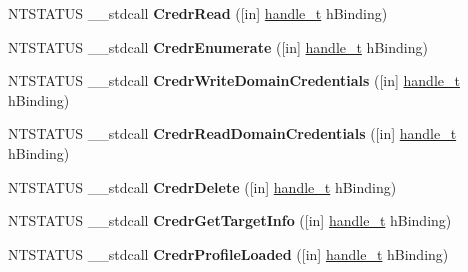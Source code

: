 \begin{DoxyCompactItemize}
\item 
\mbox{\label{interfacelsarpc_a4d760ee631ec37eff292f68b0b21cf38}} 
N\+T\+S\+T\+A\+T\+US \+\_\+\+\_\+stdcall {\bfseries Credr\+Read} (\mbox{[}in\mbox{]} \hyperlink{interfacevoid}{handle\+\_\+t} h\+Binding)
\item 
\mbox{\label{interfacelsarpc_aa58b15bcaeffe97d6f6e6b4180492862}} 
N\+T\+S\+T\+A\+T\+US \+\_\+\+\_\+stdcall {\bfseries Credr\+Enumerate} (\mbox{[}in\mbox{]} \hyperlink{interfacevoid}{handle\+\_\+t} h\+Binding)
\item 
\mbox{\label{interfacelsarpc_a44e2bdf624f11f2beab93027a9e950b8}} 
N\+T\+S\+T\+A\+T\+US \+\_\+\+\_\+stdcall {\bfseries Credr\+Write\+Domain\+Credentials} (\mbox{[}in\mbox{]} \hyperlink{interfacevoid}{handle\+\_\+t} h\+Binding)
\item 
\mbox{\label{interfacelsarpc_a36f7d4e0851fe08984b3a36328f3301f}} 
N\+T\+S\+T\+A\+T\+US \+\_\+\+\_\+stdcall {\bfseries Credr\+Read\+Domain\+Credentials} (\mbox{[}in\mbox{]} \hyperlink{interfacevoid}{handle\+\_\+t} h\+Binding)
\item 
\mbox{\label{interfacelsarpc_a7579e78ca5b31120a68e4d9c5e56bab1}} 
N\+T\+S\+T\+A\+T\+US \+\_\+\+\_\+stdcall {\bfseries Credr\+Delete} (\mbox{[}in\mbox{]} \hyperlink{interfacevoid}{handle\+\_\+t} h\+Binding)
\item 
\mbox{\label{interfacelsarpc_a99f29c387b38ebd047d2347c46216837}} 
N\+T\+S\+T\+A\+T\+US \+\_\+\+\_\+stdcall {\bfseries Credr\+Get\+Target\+Info} (\mbox{[}in\mbox{]} \hyperlink{interfacevoid}{handle\+\_\+t} h\+Binding)
\item 
\mbox{\label{interfacelsarpc_adfc28846e3a30aae12e7824d61e321ad}} 
N\+T\+S\+T\+A\+T\+US \+\_\+\+\_\+stdcall {\bfseries Credr\+Profile\+Loaded} (\mbox{[}in\mbox{]} \hyperlink{interfacevoid}{handle\+\_\+t} h\+Binding)
\item 
\mbox{\label{interfacelsarpc_a2be9e6be356468b06ea04ea24403e532}} 

\end{DoxyCompactItemize}
